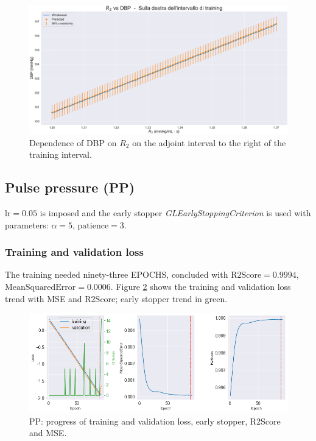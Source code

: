 \begin{figure}
    \centering
    \includegraphics[width=1\textwidth]{images/Training (risultati)/DBP/DBP - R2 - dx.pdf}
    \caption{Dependence of DBP on $R_2$ on the adjoint interval to the right of the training interval.}
    \label{DBP - R2 - dx}
\end{figure}







\newpage
\subsection{Pulse pressure (PP)}
$\text{lr}=0.05$ is imposed and the early stopper \textit{GLEarlyStoppingCriterion} is used with parameters: $\alpha = 5$, $\text{patience}=3$.


\subsubsection{Training and validation loss}
The training needed ninety-three EPOCHS, concluded with $\text{R2Score}=0.9994$, $\text{MeanSquaredError}=0.0006$. Figure \ref{PP - loss} shows the training and validation loss trend with MSE and R2Score; early stopper trend in green.
\begin{figure}[h]
    \centering
    \includegraphics[width=1\textwidth]{images/Training (risultati)/PP/PP - loss.png}
    \caption{PP: progress of training and validation loss, early stopper, R2Score and MSE.}
    \label{PP - loss}
\end{figure}

